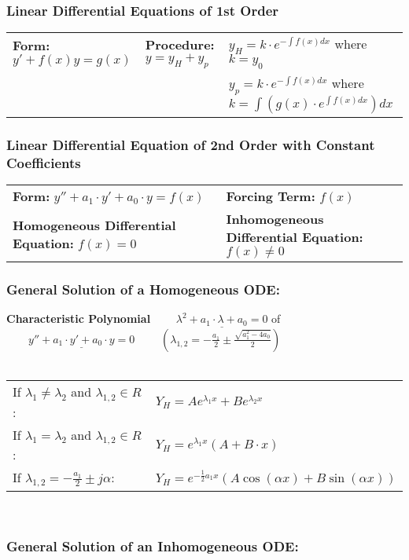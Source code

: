 
	\subsubsection{Linear Differential Equations of 1st Order}
	\begin{tabular}{lll}
	\textbf{Form:} $ y'+f(x)y = g(x) $ &
	\textbf{Procedure:} $y=y_H+y_p$ &
	$y_H=k \cdot e^{-\int f(x) dx}$ where $k=y_0$\\ & &
	$y_p=k \cdot e^{-\int f(x) dx}$ where $k=\int(g(x) \cdot e^{\int f(x) dx}) dx$
	\end{tabular}

	\subsubsection{Linear Differential Equation of 2nd Order with Constant Coefficients}
	\begin{tabular}{p{8cm}p{8cm}}
	\textbf{Form:} $y''+a_1\cdot y'+a_0\cdot y=f(x)$  &
	\textbf{Forcing Term:} $f(x)$\\
	\textbf{Homogeneous Differential Equation:} $f(x)=0$ &
	\textbf{Inhomogeneous Differential Equation:} $f(x)\neq 0$
	\end{tabular}

	\subsubsection{General Solution of a Homogeneous ODE:\quad\subsubadd{$\quad
	Y_H$}}
	\textbf{Characteristic Polynomial}
	$\qquad\underline{\lambda^2+a_1\cdot\lambda+a_0=0}$ \hspace{1cm}of
	$\qquad\underline{y''+a_1\cdot y'+a_0\cdot y=0}$
	$\qquad(\lambda_{1,2} = -\frac{a_1}{2} \pm \frac{\sqrt{a_1^2 - 4a_0}}{2})$\\ \\
	\begin{tabular}{p{8cm}p{8cm}}
	If $\lambda_1\neq \lambda_2$ and $\lambda_{1,2} \in R$:&
	$Y_H=Ae^{\lambda_1x}+Be^{\lambda_2x}$\\
	If $\lambda_1=\lambda_2$ and $\lambda_{1,2} \in R$:    &
	$Y_H=e^{\lambda_1x}(A+B\cdot x)$\\
	If $\lambda_{1,2}=-\frac{a_1}{2}\pm j\alpha$:          &
	$Y_H=e^{-\frac{1}{2}a_1x}(A\cos(\alpha x) +B\sin(\alpha x))$\\
	\end{tabular}\\

	\subsubsection{General Solution of an Inhomogeneous ODE:\quad{}}

